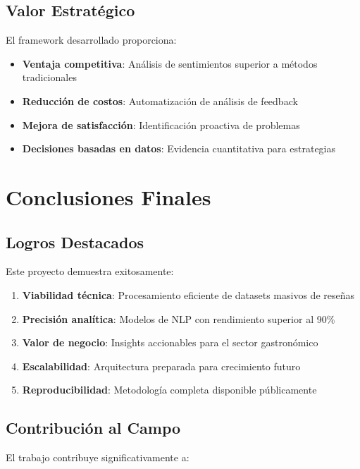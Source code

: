 \documentclass[12pt,a4paper,twoside,openany]{book}
\begin{document}
\subsection{Valor Estratégico}

El framework desarrollado proporciona:

\begin{itemize}
    \item \textbf{Ventaja competitiva}: Análisis de sentimientos superior a métodos tradicionales
    \item \textbf{Reducción de costos}: Automatización de análisis de feedback
    \item \textbf{Mejora de satisfacción}: Identificación proactiva de problemas
    \item \textbf{Decisiones basadas en datos}: Evidencia cuantitativa para estrategias
\end{itemize}

\section{Conclusiones Finales}

\subsection{Logros Destacados}

Este proyecto demuestra exitosamente:

\begin{enumerate}
    \item \textbf{Viabilidad técnica}: Procesamiento eficiente de datasets masivos de reseñas
    \item \textbf{Precisión analítica}: Modelos de NLP con rendimiento superior al 90\%
    \item \textbf{Valor de negocio}: Insights accionables para el sector gastronómico
    \item \textbf{Escalabilidad}: Arquitectura preparada para crecimiento futuro
    \item \textbf{Reproducibilidad}: Metodología completa disponible públicamente
\end{enumerate}

\subsection{Contribución al Campo}

El trabajo contribuye significativamente a:
\end{document}
